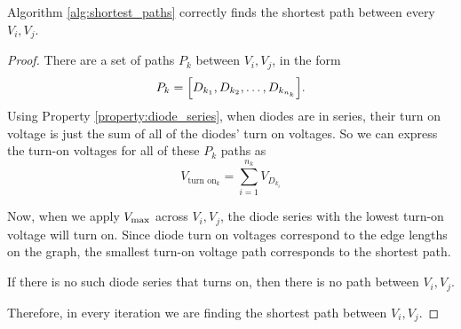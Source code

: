 \documentclass{article}
\begin{document}
\begin{theorem}
	Algorithm \ref{alg:shortest_paths} correctly finds the shortest path between every $V_i, V_j$.
\end{theorem}
\begin{proof}
	There are a set of paths $P_k$ between $V_i, V_j$, in the form
	\begin{equation}
		P_k = \pbra{
			D_{k_1}, D_{k_2}, \dots, D_{k_{n_k}}
		}.
		\label{eq:diode_paths}
	\end{equation}
	Using Property \ref{property:diode_series}, when diodes are in series,
	their turn on voltage is just the sum of all of the diodes' turn on
	voltages. So we can express the turn-on voltages for all of these $P_k$ paths as
	\begin{equation}
		V_{\text{turn on}_k} = \sum_{i=1}^{n_k} V_{D_{k_i}}
	\end{equation}

	Now, when we apply $V_\text{max}$ across $V_i, V_j$, the diode series with the
	lowest turn-on voltage will turn on. Since diode turn on voltages
	correspond to the edge lengths on the graph, the smallest turn-on voltage
	path corresponds to the shortest path.

	If there is no such diode series that turns on, then there is no path between $V_i, V_j$.

	Therefore, in every iteration we are finding the shortest path between $V_i, V_j$.
\end{proof}
\end{document}

